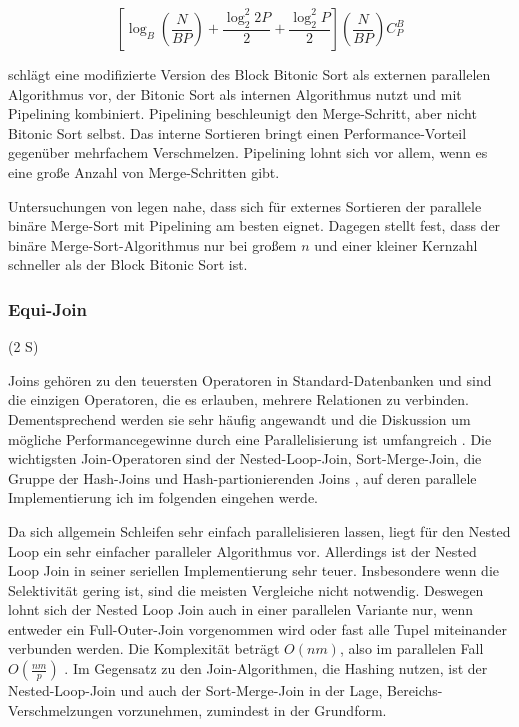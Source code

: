 \documentclass[a4paper,12pt,twoside]{article}
\begin{document}
\[ \left[ \log _B (\frac {N} {B P}) + \frac {\log _2 ^2 2 P} {2} + \frac {\log _2 ^2 P} {2} \right] ( \frac {N}{B P}) C _{P} ^{B} \]

{\textcite{Menon1986}} schlägt eine modifizierte Version des Block Bitonic Sort als externen parallelen Algorithmus vor, der Bitonic Sort als internen Algorithmus nutzt und mit Pipelining kombiniert. Pipelining beschleunigt den Merge-Schritt, aber nicht Bitonic Sort selbst. Das interne Sortieren bringt einen Performance-Vorteil gegenüber mehrfachem Verschmelzen. Pipelining lohnt sich vor allem, wenn es eine große Anzahl von Merge-Schritten gibt.

Untersuchungen von {\textcite{Bitton1984}} legen nahe, dass sich für externes Sortieren der parallele binäre Merge-Sort mit Pipelining am besten eignet. Dagegen stellt {\textcite{Menon1986}} fest, dass der binäre Merge-Sort-Algorithmus nur bei großem $n$ und einer kleiner Kernzahl schneller als der Block Bitonic Sort ist.

\subsubsection{Equi-Join} (2 S)
\label{Equi Join} 

Joins gehören zu den teuersten Operatoren in Standard-Datenbanken und sind die einzigen Operatoren, die es erlauben, mehrere Relationen zu verbinden. Dementsprechend werden sie sehr häufig angewandt und die Diskussion um mögliche Performancegewinne durch eine Parallelisierung ist umfangreich {\autocite{Richardson1987, Valduriez1984, Schneider1989, DeWitt1985, Lu1994}}. Die wichtigsten Join-Operatoren sind der Nested-Loop-Join, Sort-Merge-Join, die Gruppe der Hash-Joins und Hash-partionierenden Joins {\autocite{Mishra1992, Lu1994}}, auf deren parallele Implementierung ich im folgenden eingehen werde.

Da sich allgemein Schleifen sehr einfach parallelisieren lassen, liegt für den Nested Loop ein sehr einfacher paralleler Algorithmus vor. Allerdings ist der Nested Loop Join in seiner seriellen Implementierung sehr teuer. Insbesondere wenn die Selektivität gering ist, sind die meisten Vergleiche nicht notwendig. Deswegen lohnt sich der Nested Loop Join auch in einer parallelen Variante nur, wenn entweder ein Full-Outer-Join vorgenommen wird oder fast alle Tupel miteinander verbunden werden. Die Komplexität beträgt $ O(n m) $, also im parallelen Fall $ O( \frac {n m} {p} )$ {\autocite[S. 72]{Mishra1992}}. Im Gegensatz zu den Join-Algorithmen, die Hashing nutzen, ist der Nested-Loop-Join und auch der Sort-Merge-Join in der Lage, Bereichs-Verschmelzungen vorzunehmen, zumindest in der Grundform. 
\end{document}
